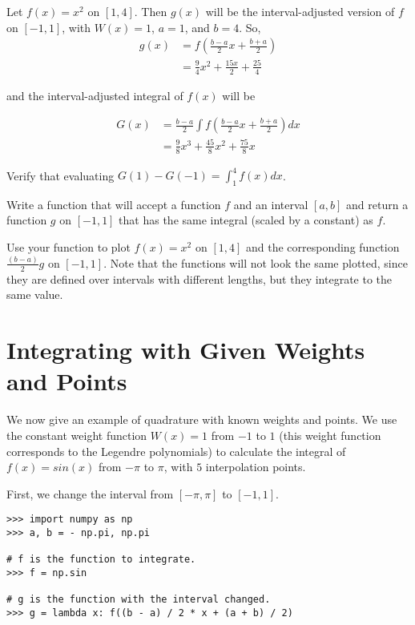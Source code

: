 \begin{problem}
Let $f(x) = x^2$ on $[1,4]$. Then $g(x)$ will be the interval-adjusted version of $f$ on $[-1,1]$, with $W(x)=1$, $a=1$, and $b=4$. So,
\begin{align*}
g(x) &= f(\frac{b-a}{2}x + \frac{b+a}{2}) \\
&= \frac{9}{4} x^2 + \frac{15 x}{2} + \frac{25}{4}
\end{align*}

and the interval-adjusted integral of $f(x)$ will be

\begin{align*}
G(x) &= \frac{b - a}{2} \int f(\frac{b - a}{2} x + \frac{b + a}{2})dx \\
&= \frac{9}{8} x^3 + \frac{45}{8} x^2 + \frac{75}{8} x
\end{align*}

Verify that evaluating $G(1) - G(-1) = \int_1^4 f(x)dx$.
\end{problem}

\begin{problem}
Write a function that will accept a function $f$ and an interval $[a,b]$ and return a function $g$ on $[-1,1]$ that has the same integral (scaled by a constant) as $f$.

Use your function to plot $f(x) = x^2$ on $[1, 4]$ and the corresponding function $\frac{\left(b - a\right)}{2}g$ on $[-1,1]$.
Note that the functions will not look the same plotted, since they are defined over intervals with different lengths, but they integrate to the same value.
\end{problem}

\section*{Integrating with Given Weights and Points} %

We now give an example of quadrature with known weights and points.
We use the constant weight function $W(x) = 1$ from $-1$ to $1$ (this weight function corresponds to the Legendre polynomials) to calculate the integral of $f(x) = sin(x)$ from $-\pi$ to $\pi$, with $5$ interpolation points.

First, we change the interval from $[-\pi,\pi]$ to $[-1,1]$.

\begin{lstlisting}
>>> import numpy as np
>>> a, b = - np.pi, np.pi

# f is the function to integrate.
>>> f = np.sin

# g is the function with the interval changed.
>>> g = lambda x: f((b - a) / 2 * x + (a + b) / 2)
\end{lstlisting}


